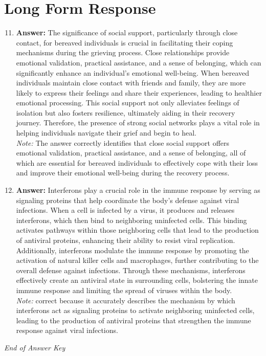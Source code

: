 \documentclass[12pt]{article}
\begin{document}
\section*{Long Form Response}
\begin{enumerate}[label=\arabic*.]
\setcounter{enumi}{10}
\item \textbf{Answer:} The significance of social support, particularly through close contact, for bereaved individuals is crucial in facilitating their coping mechanisms during the grieving process. Close relationships provide emotional validation, practical assistance, and a sense of belonging, which can significantly enhance an individual's emotional well-being. When bereaved individuals maintain close contact with friends and family, they are more likely to express their feelings and share their experiences, leading to healthier emotional processing. This social support not only alleviates feelings of isolation but also fosters resilience, ultimately aiding in their recovery journey. Therefore, the presence of strong social networks plays a vital role in helping individuals navigate their grief and begin to heal.
\\ \textit{Note:} The answer correctly identifies that close social support offers emotional validation, practical assistance, and a sense of belonging, all of which are essential for bereaved individuals to effectively cope with their loss and improve their emotional well-being during the recovery process.
\item \textbf{Answer:} Interferons play a crucial role in the immune response by serving as signaling proteins that help coordinate the body's defense against viral infections. When a cell is infected by a virus, it produces and releases interferons, which then bind to neighboring uninfected cells. This binding activates pathways within those neighboring cells that lead to the production of antiviral proteins, enhancing their ability to resist viral replication. Additionally, interferons modulate the immune response by promoting the activation of natural killer cells and macrophages, further contributing to the overall defense against infections. Through these mechanisms, interferons effectively create an antiviral state in surrounding cells, bolstering the innate immune response and limiting the spread of viruses within the body.
\\ \textit{Note:} correct because it accurately describes the mechanism by which interferons act as signaling proteins to activate neighboring uninfected cells, leading to the production of antiviral proteins that strengthen the immune response against viral infections.
\end{enumerate}

\vfill
\noindent\textit{End of Answer Key}
\end{document}
